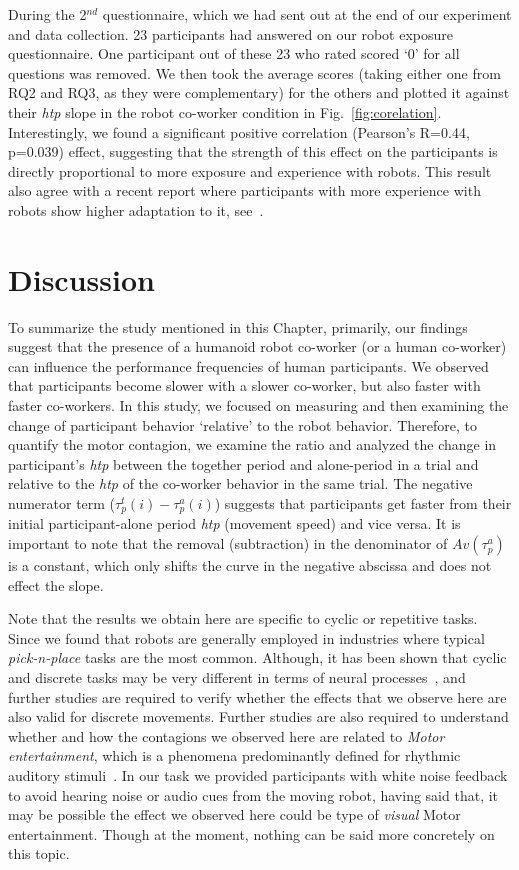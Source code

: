During the 2$^{nd}$ questionnaire, which we had sent out at the end of our experiment and data collection. 23 participants had answered on our robot exposure questionnaire. One participant out of these 23 who rated scored `0' for all questions was removed. We then took the average scores (taking either one from RQ2 and RQ3, as they were complementary) for the others and plotted it against their {\it htp} slope in the robot co-worker condition in Fig.~\ref{fig:corelation}. Interestingly, we found a significant positive correlation (Pearson's R=0.44, p=0.039) effect, suggesting that the strength of this effect on the participants is directly proportional to more exposure and experience with robots. This result also agree with a recent report where participants with more experience with robots show higher adaptation to it, see~\cite{vannucci:roman:2017}.

\clearpage

\section{Discussion}

To summarize the study mentioned in this Chapter, primarily, our findings suggest that the presence of a humanoid robot co-worker (or a human co-worker) can influence the performance frequencies of human participants. We observed that participants become slower with a slower co-worker, but also faster with faster co-workers. In this study, we focused on measuring and then examining the change of participant behavior `relative' to the robot behavior. Therefore, to quantify the motor contagion, we examine the ratio and analyzed the change in participant's \textit{htp} between the together period and alone-period in a trial and relative to the {\it htp} of the co-worker behavior in the same trial. The negative numerator term ($\tau_p^t(i)-\tau_p^a(i)$) suggests that participants get faster from their initial participant-alone period \textit{htp} (movement speed) and vice versa. It is important to note that the removal (subtraction) in the denominator of $Av(\tau_p^a)$ is a constant, which only shifts the curve in the negative abscissa and does not effect the slope.  


Note that the results we obtain here are specific to cyclic or repetitive tasks. Since we found that robots are generally employed in industries where typical \textit{pick-n-place} tasks are the most common. Although, it has been shown that cyclic and discrete tasks may be very different in terms of neural processes~\cite{Schaal:Nature:2004}, and further studies are required to verify whether the effects that we observe here are also valid for discrete movements. Further studies are also required to understand whether and how the contagions we observed here are related to \textit{Motor entertainment}, which is a phenomena predominantly defined for rhythmic auditory stimuli~\cite{Tierney:Frontiers:2014,Schachner:Elsevier:2009}. In our task we provided participants with white noise feedback to avoid hearing noise or audio cues from the moving robot, having said that, it may be possible the effect we observed here could be type of \textit{visual} Motor entertainment. Though at the moment, nothing can be said more concretely on this topic.


